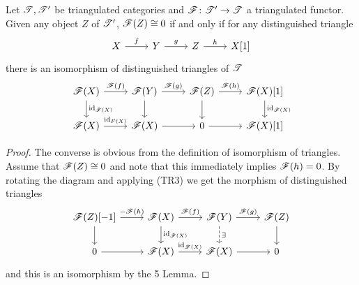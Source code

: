 \documentclass[dissertation.tex]{subfiles}
\begin{document}
\begin{prop}
  Let $\mathscr{T}, \mathscr{T}^\prime$ be triangulated categories and $\mathscr{F} \colon \mathscr{T}^\prime \rightarrow \mathscr{T}$ a triangulated functor.
  Given any object $Z$ of $\mathscr{T}^\prime$, $\mathscr{F}(Z) \cong 0$ if and only if for any distinguished triangle
  $$\begin{tikzcd}
    X \arrow{r}{f} & Y \arrow{r}{g} & Z \arrow{r}{h} & X[1]
  \end{tikzcd}$$
  there is an isomorphism of distinguished triangles of $\mathscr{T}$
  $$\begin{tikzcd}
    \F(X) \arrow{r}{\F(f)}\arrow{d}{\id_{\F(X)}} & \F(Y) \arrow{r}{\F(g)}\arrow{d} & \F(Z) \arrow{r}{\F(h)}\arrow{d} & \F(X)[1]\arrow{d}{\id_{\F(X)}}\\
      \F(X) \arrow{r}{\id_{F(X)}} & \F(X) \arrow{r} & 0 \arrow{r} & \F(X)[1]
  \end{tikzcd}$$
  
  \begin{proof}
    The converse is obvious from the definition of isomorphism of triangles.
    Assume that $\mathscr{F}(Z) \cong 0$ and note that this immediately implies $\mathscr{F}(h) = 0$.    
    By rotating the diagram and applying (TR3) we get the morphism of distinguished triangles
    $$\begin{tikzcd}
      \F(Z)[-1] \arrow{r}{-\F(h)}\arrow{d} & \F(X) \arrow{r}{\F(f)}\arrow{d}{\id_{\F(X)}} & \F(Y) \arrow{r}{\F(g)}\arrow[dashed]{d}{\exists} & \F(Z)\arrow{d}\\
      0 \arrow{r} & \F(X) \arrow{r}{\id_{\F(X)}} & \F(X) \arrow{r} & 0
    \end{tikzcd}$$
    and this is an isomorphism by the 5 Lemma.
  \end{proof}
\end{prop}
\end{document}
